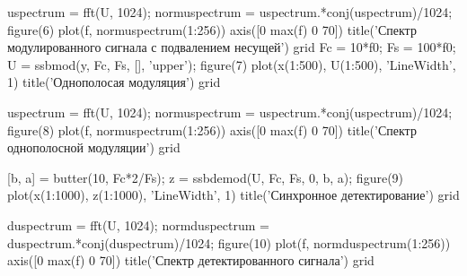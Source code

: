 \documentclass[10pt,a4paper]{report}
\begin{document}
uspectrum = fft(U, 1024);\newline
normuspectrum = uspectrum.*conj(uspectrum)/1024;\newline
figure(6)\newline
plot(f, normuspectrum(1:256))\newline
axis([0 max(f) 0 70])\newline
title('Спектр модулированного сигнала с подвалением несущей')\newline
grid\newline
\newline
Fc = 10*f0;\newline
Fs = 100*f0;\newline
U = ssbmod(y, Fc, Fs, [], 'upper');\newline
figure(7)\newline
plot(x(1:500), U(1:500), 'LineWidth', 1)\newline
title('Однополосая модуляция')\newline
grid\newline

uspectrum = fft(U, 1024);\newline
normuspectrum = uspectrum.*conj(uspectrum)/1024;\newline
figure(8)\newline
plot(f, normuspectrum(1:256))\newline
axis([0 max(f) 0 70])\newline
title('Спектр однополосной модуляции')\newline
grid\newline

[b, a] = butter(10, Fc*2/Fs);\newline
z = ssbdemod(U, Fc, Fs, 0, b, a);\newline
figure(9)\newline
plot(x(1:1000), z(1:1000), 'LineWidth', 1)\newline
title('Синхронное детектирование')\newline
grid\newline

duspectrum = fft(U, 1024);\newline
normduspectrum = duspectrum.*conj(duspectrum)/1024;\newline
figure(10)\newline
plot(f, normduspectrum(1:256))\newline
axis([0 max(f) 0 70])\newline
title('Спектр детектированного сигнала')\newline
grid\newline
\end{document}
